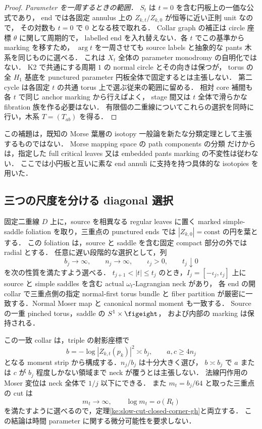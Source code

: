 \begin{proof}
\emph{Parameter を一周するときの範囲．}
$S_t$ は $t=0$ を含む円板上の一価な公式であり，
end では各固定 annulus 上の $Z_{k,t}/Z_{k,0}$ が恒等に近い正則 unit なので，
その対数も $t=0$ で $0$ となる枝で取れる．
Collar graph の補正は circle 座標 $\theta$ に関して周期的で，
labelled end を入れ替えない．各 $t$ でこの基準から marking を移すため，
$\arg t$ を一周させても source labels と抽象的な pants 木系を同じものに選べる．
これは $X_t$ 全体の parameter monodromy の自明化ではない．
K2 で共通にする周期 $1$ の normal circle とその向きは保つが，
torus の全 $H_1$ 基底を punctured parameter 円板全体で固定するとは主張しない．
第二 cycle は各固定 $t$ の共通 torus 上で選ぶ従来の範囲に留める．
相対 core 補間も各 $t$ で同じ anchor marking から行えばよく，
stage 間又は $t$ 全体で滑らかな fibration 族を作る必要はない．
有限個の二重線についてこれらの選択を同時に行い，木系 $T=(T_{ab})$ を得る．
\end{proof}

この補題は，既知の Morse 葉層の isotopy 一般論を新たな分類定理として主張するものではない．
Morse mapping space の path components の分類
\cite[Main Theorem]{Maksymenko}だけからは，指定した full critical leaves 又は
embedded pants marking の不変性は従わない．
ここでは小円板と互いに素な end annuli に支持を持つ具体的な isotopies を用いた．

\subsection{三つの尺度を分ける diagonal 選択}

\begin{theorem}
\label{ke:neck-corner-diagonal-matching}
固定二重線 $D$ 上に，source を相異なる regular leaves に置く
marked simple-saddle foliation を取り，三重点の punctured ends では
$|Z_{k,0}|=\mathrm{const}$ の円を葉とする．
この foliation は，source と saddle を含む固定 compact 部分の外では radial とする．
任意に遅い段階的な選択として，列
\[
 b_j\longrightarrow\infty,\qquad
 n_j\longrightarrow\infty,\qquad
 \iota_j>0,\qquad t_j\downarrow0
\]
を次の性質を満たすよう選べる．
$t_{j+1}<|t|\le t_j$ のとき，$I_j=[-\iota_j,\iota_j]$ 上に
source と simple saddles を含む actual $\omega_t$-Lagrangian neck があり，
各 end の開 collar で三重点側の指定 normal-first torus bundle と
fiber partition が厳密に一致する．Normal Moser map と canonical normal moment も一致する．
Source の一重 pinched torus，saddle の $S^1\times\figeight$，
および内部の marking は保持される．

この一致 collar は，triple の射影座標で
\[
 b=-\log|Z_{k,t}(p_k)|^2\asymp b_j,
 \qquad a,c\ge4n_j
\]
となる moment strip から構成する．$n_j/b_j$ は十分大きく選び，
$b\asymp b_j$ で $a$ または $c$ が $b_j$ 程度しかない領域まで
neck が覆うとは主張しない．
法線円作用の Moser 変位は neck 全体で $1/j$ 以下にできる．
また $m_t=b_j/64$ と取った三重点の cut は
\[
 m_t\to\infty,\qquad \log m_t=o(R_t)
\]
を満たすように選べるので，定理\ref{ke:slow-cut-closed-corner-gh}と両立する．
この結論は時間 parameter に関する微分可能性を要求しない．
\end{theorem}

